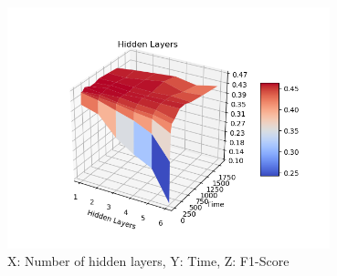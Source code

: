 \begin{figure}[H]
\centering
\includegraphics[height=7cm]{pictures/hl_time_fscore.png}
\caption{X: Number of hidden layers, Y: Time, Z: F1-Score}
\label{fig:hl_time_fscore}
\end{figure}

